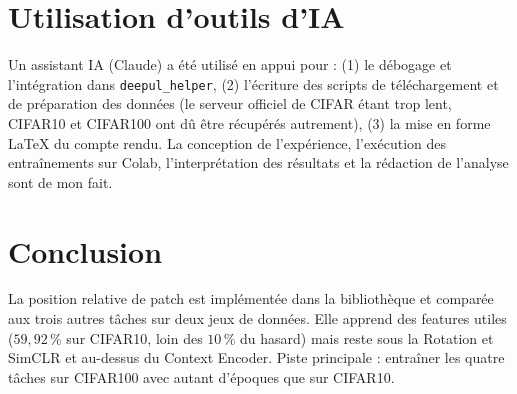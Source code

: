 \documentclass[12pt,a4paper]{article}
\newcommand{\code}[1]{\texttt{#1}}
\begin{document}
\section{Utilisation d'outils d'IA}

Un assistant IA (Claude) a été utilisé en appui pour : (1) le débogage et l'intégration dans \code{deepul\_helper}, (2) l'écriture des scripts de téléchargement et de préparation des données (le serveur officiel de CIFAR étant trop lent, CIFAR10 et CIFAR100 ont dû être récupérés autrement), (3) la mise en forme \LaTeX{} du compte rendu. La conception de l'expérience, l'exécution des entraînements sur Colab, l'interprétation des résultats et la rédaction de l'analyse sont de mon fait.

\section{Conclusion}

La position relative de patch est implémentée dans la bibliothèque et comparée aux trois autres tâches sur deux jeux de données.
Elle apprend des features utiles ($59{,}92\,\%$ sur CIFAR10, loin des $10\,\%$ du hasard) mais reste sous la Rotation et SimCLR
et au-dessus du Context Encoder. Piste principale : entraîner les quatre tâches sur CIFAR100 avec autant d'époques que sur CIFAR10.
\end{document}
